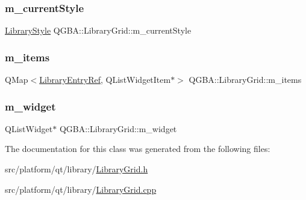 \mbox{\label{class_q_g_b_a_1_1_library_grid_adc0f66380291b7c974457b1329520782}} 
\subsubsection{\texorpdfstring{m\+\_\+current\+Style}{m\_currentStyle}}
{\footnotesize\ttfamily \mbox{\hyperlink{namespace_q_g_b_a_a4804d48d02699a2c1d2436e9269a8bb8}{Library\+Style}} Q\+G\+B\+A\+::\+Library\+Grid\+::m\+\_\+current\+Style\hspace{0.3cm}{\ttfamily [private]}}

\mbox{\label{class_q_g_b_a_1_1_library_grid_a37f9e0863e5153ed958764de6bd71718}} 
\subsubsection{\texorpdfstring{m\+\_\+items}{m\_items}}
{\footnotesize\ttfamily Q\+Map$<$\mbox{\hyperlink{namespace_q_g_b_a_a201fa9f2cb8f778666a134ba81909358}{Library\+Entry\+Ref}}, Q\+List\+Widget\+Item$\ast$$>$ Q\+G\+B\+A\+::\+Library\+Grid\+::m\+\_\+items\hspace{0.3cm}{\ttfamily [private]}}

\mbox{\label{class_q_g_b_a_1_1_library_grid_a2f053e144d3ad536d9d92e0ceaf7e21d}} 
\subsubsection{\texorpdfstring{m\+\_\+widget}{m\_widget}}
{\footnotesize\ttfamily Q\+List\+Widget$\ast$ Q\+G\+B\+A\+::\+Library\+Grid\+::m\+\_\+widget\hspace{0.3cm}{\ttfamily [private]}}



The documentation for this class was generated from the following files\+:\begin{DoxyCompactItemize}
\item 
src/platform/qt/library/\mbox{\hyperlink{_library_grid_8h}{Library\+Grid.\+h}}\item 
src/platform/qt/library/\mbox{\hyperlink{_library_grid_8cpp}{Library\+Grid.\+cpp}}\end{DoxyCompactItemize}
